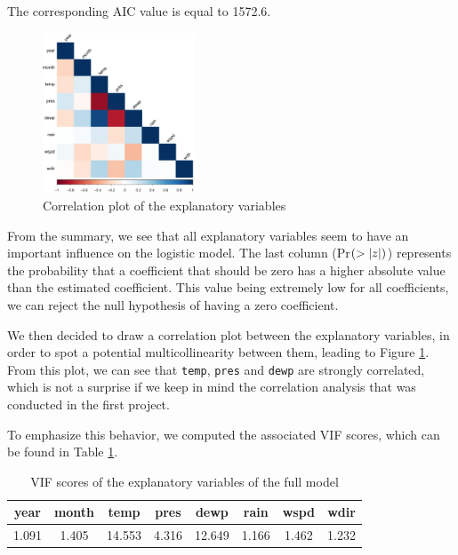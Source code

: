\documentclass[a4paper, 12pt]{article}
\begin{document}
	The corresponding AIC value is equal to \num{1572.6}.
	
	\begin{figure}
	    \vspace{-1.5em}
	    \centering
	    \includegraphics[width=0.4\textwidth]{resources/pdf/correlation_plot.pdf}
	    \caption{Correlation plot of the explanatory variables}
	    \label{fig:corrplot}
	    \vspace{-1.5em}
	\end{figure}
	
	From the summary, we see that all explanatory variables seem to have an important influence on the logistic model. The last column (Pr$(>\left|z\right|)$) represents the probability that a coefficient that should be zero has a higher absolute value than the estimated coefficient. This value being extremely low for all coefficients, we can reject the null hypothesis of having a zero coefficient.
	
	We then decided to draw a correlation plot between the explanatory variables, in order to spot a potential multicollinearity between them, leading to Figure \ref{fig:corrplot}. From this plot, we can see that \texttt{temp}, \texttt{pres} and \texttt{dewp} are strongly correlated, which is not a surprise if we keep in mind the correlation analysis that was conducted in the first project.
	
	To emphasize this behavior, we computed the associated VIF scores, which can be found in Table \ref{tab:vif_scores}.
	
	\begin{table}[h]
	    \centering
	    \begin{tabular}{cccccccc}
	        year & month & temp & pres & dewp & rain & wspd & wdir \\
	        \hline
	        \num{1.091} & \num{1.405} & \num{14.553} & \num{4.316} & \num{12.649} & \num{1.166} & \num{1.462} & \num{1.232}
	    \end{tabular}
	    \caption{VIF scores of the explanatory variables of the full model}
	    \label{tab:vif_scores}
	\end{table}
\end{document}
